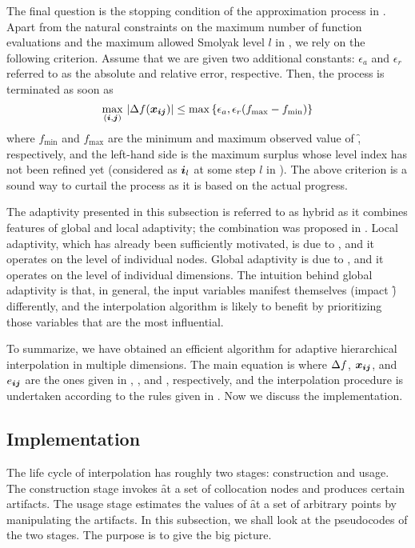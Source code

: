 The final question is the stopping condition of the approximation process in
. Apart from the natural constraints on the maximum number
of function evaluations and the maximum allowed Smolyak level $l$ in
, we rely on the following criterion. Assume that we are
given two additional constants: $\epsilon_a$ and $\epsilon_r$ referred to as the
absolute and relative error, respective. Then, the process is terminated as soon
as
\[
  \max_{(\boldsymbol{i}, \boldsymbol{j})} \, |\Delta f(\boldsymbol{x}_{\boldsymbol{i} \boldsymbol{j}})| \leq \max \left\{ \epsilon_a, \epsilon_r (f_\text{max} - f_\text{min}) \right\}
\]
where $f_\text{min}$ and $f_\text{max}$ are the minimum and maximum observed
value of \f, respectively, and the left-hand side is the maximum surplus whose
level index has not been refined yet (considered as $\boldsymbol{i}_l$ at some step $l$ in
). The above criterion is a sound way to curtail the process
as it is based on the actual progress.

The adaptivity presented in this subsection is referred to as hybrid as it
combines features of global and local adaptivity; the combination was proposed
in \cite{jakeman2012}. Local adaptivity, which has already been sufficiently
motivated, is due to \cite{ma2009}, and it operates on the level of individual
nodes. Global adaptivity is due to \cite{klimke2006}, and it operates on the
level of individual dimensions. The intuition behind global adaptivity is that,
in general, the input variables manifest themselves (impact \f) differently, and
the interpolation algorithm is likely to benefit by prioritizing those variables
that are the most influential.

To summarize, we have obtained an efficient algorithm for adaptive hierarchical
interpolation in multiple dimensions. The main equation is 
where $\Delta f$, $\boldsymbol{x}_{\boldsymbol{i} \boldsymbol{j}}$, and $e_{\boldsymbol{i} \boldsymbol{j}}$ are the ones given in
, , and , respectively, and the
interpolation procedure is undertaken according to the rules given in
. Now we discuss the implementation.

\subsection{Implementation}

The life cycle of interpolation has roughly two stages: construction and usage.
The construction stage invokes \f at a set of collocation nodes and produces
certain artifacts. The usage stage estimates the values of \f at a set of
arbitrary points by manipulating the artifacts. In this subsection, we shall
look at the pseudocodes of the two stages. The purpose is to give the big
picture.


